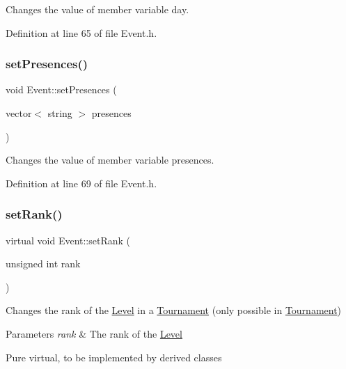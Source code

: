 Changes the value of member variable day. 



Definition at line 65 of file Event.\+h.

\hypertarget{class_event_a2e63387b12ece5fc8b38c6b1142df219}{}\label{class_event_a2e63387b12ece5fc8b38c6b1142df219} 
\subsubsection{\texorpdfstring{set\+Presences()}{setPresences()}}
{\footnotesize\ttfamily void Event\+::set\+Presences (\begin{DoxyParamCaption}\item[{vector$<$ string $>$}]{presences }\end{DoxyParamCaption})\hspace{0.3cm}{\ttfamily [inline]}}



Changes the value of member variable presences. 



Definition at line 69 of file Event.\+h.

\hypertarget{class_event_a5bccaba301e9038957ec4138df404524}{}\label{class_event_a5bccaba301e9038957ec4138df404524} 
\subsubsection{\texorpdfstring{set\+Rank()}{setRank()}}
{\footnotesize\ttfamily virtual void Event\+::set\+Rank (\begin{DoxyParamCaption}\item[{unsigned int}]{rank }\end{DoxyParamCaption})\hspace{0.3cm}{\ttfamily [pure virtual]}}



Changes the rank of the \hyperlink{class_level}{Level} in a \hyperlink{class_tournament}{Tournament} (only possible in \hyperlink{class_tournament}{Tournament}) 


\begin{DoxyParams}{Parameters}
{\em rank} & The rank of the \hyperlink{class_level}{Level}\\
\hline
\end{DoxyParams}
Pure virtual, to be implemented by derived classes 

